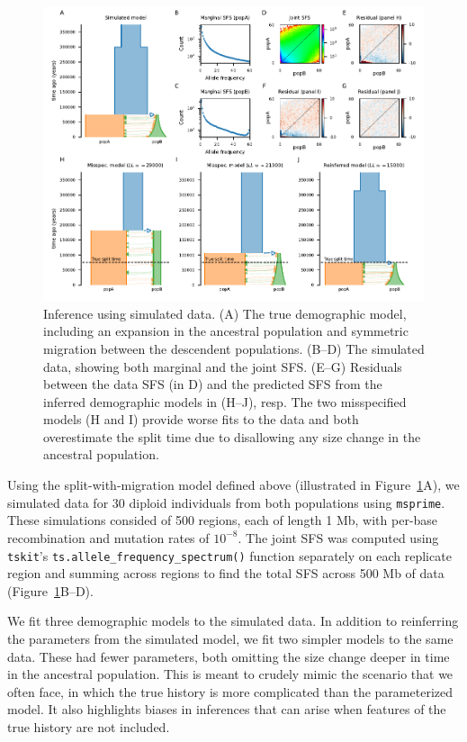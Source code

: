\documentclass[]{article}
\newcommand{\msprime}{\texttt{msprime}\xspace}
\newcommand{\tskit}{\texttt{tskit}\xspace}
\begin{document}
\begin{figure}[t!]
    \includegraphics{../example1/fig1.pdf}
    \caption{
        Inference using simulated data. (A) The true demographic model,
        including an expansion in the ancestral population and symmetric
        migration between the descendent populations. (B--D) The simulated
        data, showing both marginal and the joint SFS. (E--G) Residuals
        between the data SFS (in D) and the predicted SFS from the inferred
        demographic models in (H--J), resp.  The two misspecified models (H and
        I) provide worse fits to the data and both overestimate the split time
        due to disallowing any size change in the ancestral population.
    }
    \label{fig:im}
\end{figure}

Using the split-with-migration model defined above (illustrated in
Figure~\ref{fig:im}A), we simulated data for 30 diploid individuals from both
populations using \msprime \citep{baumdicker2022efficient}. These simulations
consided of 500 regions, each of length 1 Mb, with per-base recombination and
mutation rates of $10^{-8}$. The joint SFS was computed using \tskit's
\texttt{ts.allele\_frequency\_spectrum()} function separately on each replicate
region and summing across regions to find the total SFS across 500 Mb of data
(Figure~\ref{fig:im}B--D).

We fit three demographic models to the simulated data. In addition to
reinferring the parameters from the simulated model, we fit two simpler models
to the same data. These had fewer parameters, both omitting the size change
deeper in time in the ancestral population. This is meant to crudely mimic the
scenario that we often face, in which the true history is more complicated than
the parameterized model. It also highlights biases in inferences that can arise
when features of the true history are not included.
\end{document}

